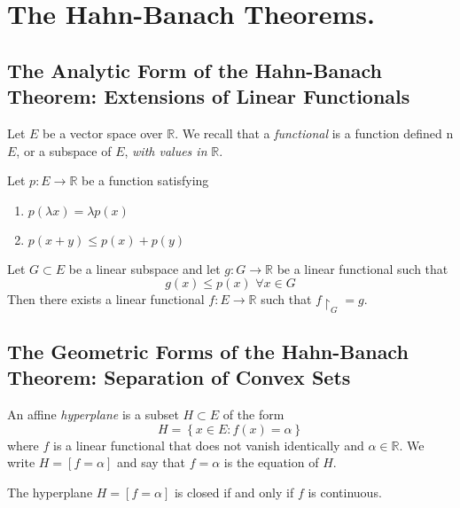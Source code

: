 \section{The Hahn-Banach Theorems.}
\subsection{The Analytic Form of the Hahn-Banach Theorem: Extensions of Linear Functionals}
Let $E$ be a vector space over $ \mathbb{R}$. We recall that a \textit{functional
} is a function defined n $E$, or a subspace of $E$, \textit{with values in} $ \mathbb{R}$.

\begin{thm}
Let $p: E \to \mathbb{R}$ be a function satisfying
\begin{enumerate}
	\item $p( \lambda x) = \lambda p (x)$
	\item $p (x+y) \leq p(x) + p(y)$
\end{enumerate}
Let $G \subset E$ be a linear subspace and let $g: G \to \mathbb{R}$ be a linear functional such that
\[
	g(x) \leq p(x) \hspace{4pt} \forall x \in G
\]
Then there exists a linear functional $f: E \to \mathbb{R}$ such that $f \restriction_G = g$.
\end{thm}

\subsection{The Geometric Forms of the Hahn-Banach Theorem: Separation of Convex Sets}

\begin{defn}
An affine \textit{hyperplane} is a subset $H \subset E$ of the form
\[
	H = \left\{ x \in E: f(x) = \alpha \right\}
\]
where $f$ is a linear functional that does not vanish identically and $ \alpha \in \mathbb{R}$. We write $H = \left[ f = \alpha \right]$ and say that $f = \alpha$ is the equation of $H$.
\end{defn}

\begin{prop}
The hyperplane $H = \left[ f= \alpha \right]$ is closed if and only if $f$ is continuous.
\end{prop}

